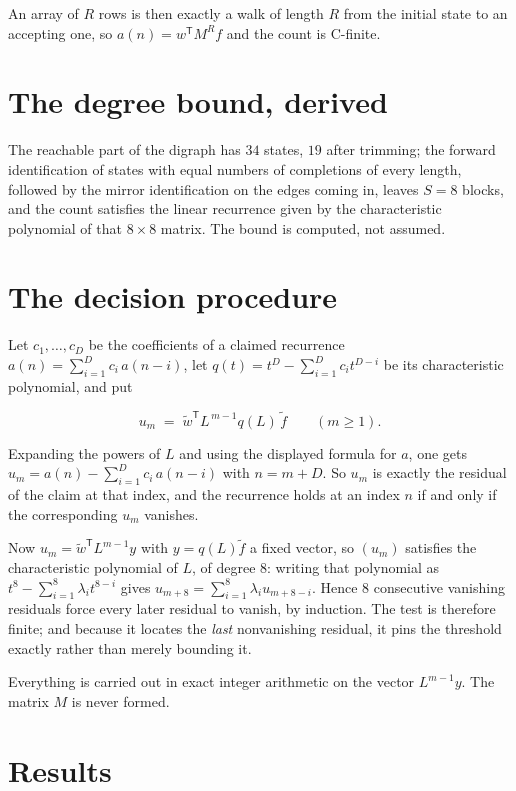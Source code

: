 \documentclass[11pt]{article}
\theoremstyle{definition}
\begin{document}
An array of $R$ rows is then exactly a walk of length $R$ from the initial state to an accepting one, so $a(n) = w^{\mathsf T}M^{R}f$ and the count is C-finite.

\section{The degree bound, derived}

The reachable part of the digraph has $34$ states, $19$ after trimming; the forward identification of states with equal numbers of completions of every length, followed by the mirror identification on the edges coming in, leaves $S = 8$ blocks, and the count satisfies the linear recurrence given by the characteristic polynomial of that $8\times8$ matrix. The bound is computed, not assumed.

\section{The decision procedure}

Let $c_1,\dots,c_D$ be the coefficients of a claimed recurrence $a(n) = \sum_{i=1}^{D} c_i\,a(n-i)$, let $q(t) = t^{D} - \sum_{i=1}^{D} c_i t^{D-i}$ be its characteristic polynomial, and put

\[u_m \;=\; \tilde w^{\mathsf T} L^{\,m-1} q(L)\,\tilde f \qquad (m \ge 1).\]

Expanding the powers of $L$ and using the displayed formula for $a$, one gets $u_m = a(n) - \sum_{i=1}^{D} c_i\,a(n-i)$ with $n = m + D$. So $u_m$ is exactly the residual of the claim at that index, and the recurrence holds at an index $n$ if and only if the corresponding $u_m$ vanishes.

Now $u_m = \tilde w^{\mathsf T} L^{m-1} y$ with $y = q(L)\tilde f$ a fixed vector, so $(u_m)$ satisfies the characteristic polynomial of $L$, of degree $8$: writing that polynomial as $t^{8} - \sum_{i=1}^{8} \lambda_i t^{8-i}$ gives $u_{m+8} = \sum_{i=1}^{8} \lambda_i u_{m+8-i}$. Hence $8$ consecutive vanishing residuals force every later residual to vanish, by induction. The test is therefore finite; and because it locates the {\itshape last} nonvanishing residual, it pins the threshold exactly rather than merely bounding it.

Everything is carried out in exact integer arithmetic on the vector $L^{m-1}y$. The matrix $M$ is never formed.

\section{Results}
\end{document}
